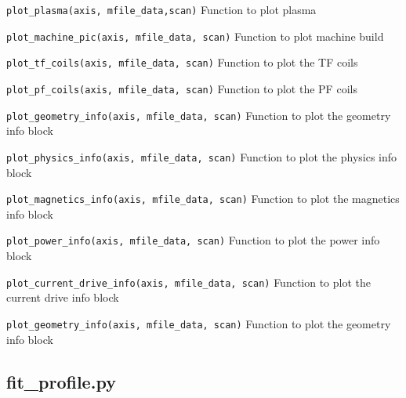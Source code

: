 \begin{description}

\item{\verb|plot_plasma(axis, mfile_data,scan)|} Function to plot plasma

\item{\verb|plot_machine_pic(axis, mfile_data, scan)|} Function to plot machine build

\item{\verb|plot_tf_coils(axis, mfile_data, scan)|} Function to plot the TF coils

\item{\verb|plot_pf_coils(axis, mfile_data, scan)|} Function to plot the PF coils

\item{\verb|plot_geometry_info(axis, mfile_data, scan)|} Function to plot the
  geometry info block

\item{\verb|plot_physics_info(axis, mfile_data, scan)|} Function to plot the
  physics info block

\item{\verb|plot_magnetics_info(axis, mfile_data, scan)|} Function to plot the
  magnetics info block

\item{\verb|plot_power_info(axis, mfile_data, scan)|} Function to plot the
  power info block

\item{\verb|plot_current_drive_info(axis, mfile_data, scan)|} Function to plot
  the current drive info block

\item{\verb|plot_geometry_info(axis, mfile_data, scan)|} Function to plot the
  geometry info block

\end{description}


\subsection{fit\_profile.py}

